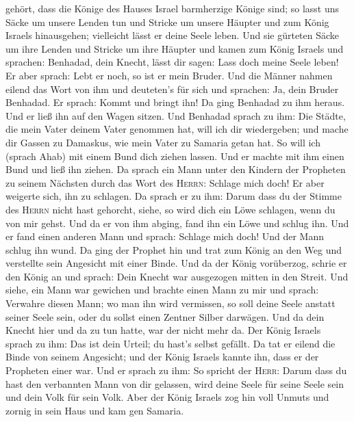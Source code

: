 gehört, dass die Könige des Hauses Israel barmherzige Könige sind; so
lasst uns Säcke um unsere Lenden tun und Stricke um unsere Häupter und
zum König Israels hinausgehen; vielleicht lässt er deine Seele leben.
 Und sie gürteten Säcke um ihre Lenden und Stricke um
ihre Häupter und kamen zum König Israels und sprachen: Benhadad, dein
Knecht, lässt dir sagen: Lass doch meine Seele leben! Er aber sprach:
Lebt er noch, so ist er mein Bruder.  Und die Männer
nahmen eilend das Wort von ihm und deuteten's für sich und sprachen: Ja,
dein Bruder Benhadad. Er sprach: Kommt und bringt ihn! Da ging Benhadad
zu ihm heraus. Und er ließ ihn auf den Wagen sitzen.  Und
Benhadad sprach zu ihm: Die Städte, die mein Vater deinem Vater genommen
hat, will ich dir wiedergeben; und mache dir Gassen zu Damaskus, wie
mein Vater zu Samaria getan hat. So will ich (sprach Ahab) mit einem
Bund dich ziehen lassen. Und er machte mit ihm einen Bund und ließ ihn
ziehen.  Da sprach ein Mann unter den Kindern der
Propheten zu seinem Nächsten durch das Wort des \textsc{Herrn}: Schlage
mich doch! Er aber weigerte sich, ihn zu schlagen.  Da
sprach er zu ihm: Darum dass du der Stimme des \textsc{Herrn} nicht hast
gehorcht, siehe, so wird dich ein Löwe schlagen, wenn du von mir gehst.
Und da er von ihm abging, fand ihn ein Löwe und schlug ihn.
 Und er fand einen anderen Mann und sprach: Schlage mich
doch! Und der Mann schlug ihn wund.  Da ging der Prophet
hin und trat zum König an den Weg und verstellte sein Angesicht mit
einer Binde.  Und da der König vorüberzog, schrie er den
König an und sprach: Dein Knecht war ausgezogen mitten in den Streit.
Und siehe, ein Mann war gewichen und brachte einen Mann zu mir und
sprach: Verwahre diesen Mann; wo man ihn wird vermissen, so soll deine
Seele anstatt seiner Seele sein, oder du sollst einen Zentner Silber
darwägen.  Und da dein Knecht hier und da zu tun hatte,
war der nicht mehr da. Der König Israels sprach zu ihm: Das ist dein
Urteil; du hast's selbst gefällt.  Da tat er eilend die
Binde von seinem Angesicht; und der König Israels kannte ihn, dass er
der Propheten einer war.  Und er sprach zu ihm: So
spricht der \textsc{Herr}: Darum dass du hast den verbannten Mann von
dir gelassen, wird deine Seele für seine Seele sein und dein Volk für
sein Volk.  Aber der König Israels zog hin voll Unmuts
und zornig in sein Haus und kam gen Samaria.


